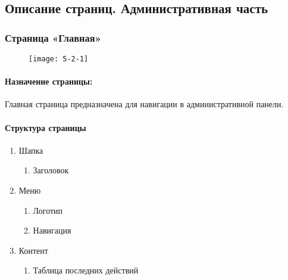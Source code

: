 \subsection{Описание страниц. Административная часть}
\subsubsection{Страница «Главная»}
\begin{figure}[H]
	\texttt{[image: 5-2-1]}
\end{figure}
\paragraph{Назначение страницы:}
Главная страница предназначена для навигации в административной панели.

\paragraph{Структура страницы}
\begin{enumerate}
	\item Шапка
	\begin{enumerate}
		\item Заголовок
	\end{enumerate}

	\item Меню
	\begin{enumerate}
		\item  Логотип
		\item  Навигация
	\end{enumerate}

	\item  Контент
	\begin{enumerate}
		\item  Таблица последних действий
	\end{enumerate}
\end{enumerate}

